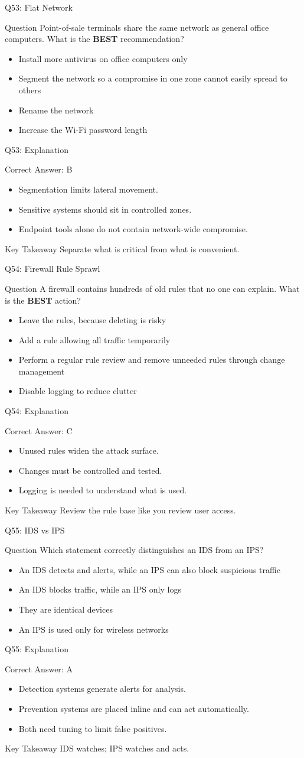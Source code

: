\documentclass[aspectratio=169]{beamer}
\newcommand{\hq}[7]{%
	\begin{frame}{Q#1: #2}
		\begin{block}{Question}
			#3
		\end{block}
		\begin{itemize}
			#4
		\end{itemize}
	\end{frame}
	\begin{frame}{Q#1: Explanation}
		\begin{block}{Correct Answer: #5}
			\begin{itemize}
				#6
			\end{itemize}
		\end{block}
		\begin{alertblock}{Key Takeaway}
			#7
		\end{alertblock}
	\end{frame}
}
\begin{document}
	\hq{53}{Flat Network}
	{Point-of-sale terminals share the same network as general office computers. What is the \textbf{BEST} recommendation?}
	{\item[\textbf{(A)}] Install more antivirus on office computers only
		\item[\textbf{(B)}] Segment the network so a compromise in one zone cannot easily spread to others
		\item[\textbf{(C)}] Rename the network
		\item[\textbf{(D)}] Increase the Wi-Fi password length}
	{B}
	{\item Segmentation limits lateral movement.
		\item Sensitive systems should sit in controlled zones.
		\item Endpoint tools alone do not contain network-wide compromise.}
	{Separate what is critical from what is convenient.}
	
	\hq{54}{Firewall Rule Sprawl}
	{A firewall contains hundreds of old rules that no one can explain. What is the \textbf{BEST} action?}
	{\item[\textbf{(A)}] Leave the rules, because deleting is risky
		\item[\textbf{(B)}] Add a rule allowing all traffic temporarily
		\item[\textbf{(C)}] Perform a regular rule review and remove unneeded rules through change management
		\item[\textbf{(D)}] Disable logging to reduce clutter}
	{C}
	{\item Unused rules widen the attack surface.
		\item Changes must be controlled and tested.
		\item Logging is needed to understand what is used.}
	{Review the rule base like you review user access.}
	
	\hq{55}{IDS vs IPS}
	{Which statement correctly distinguishes an IDS from an IPS?}
	{\item[\textbf{(A)}] An IDS detects and alerts, while an IPS can also block suspicious traffic
		\item[\textbf{(B)}] An IDS blocks traffic, while an IPS only logs
		\item[\textbf{(C)}] They are identical devices
		\item[\textbf{(D)}] An IPS is used only for wireless networks}
	{A}
	{\item Detection systems generate alerts for analysis.
		\item Prevention systems are placed inline and can act automatically.
		\item Both need tuning to limit false positives.}
	{IDS watches; IPS watches and acts.}
	
\end{document}
